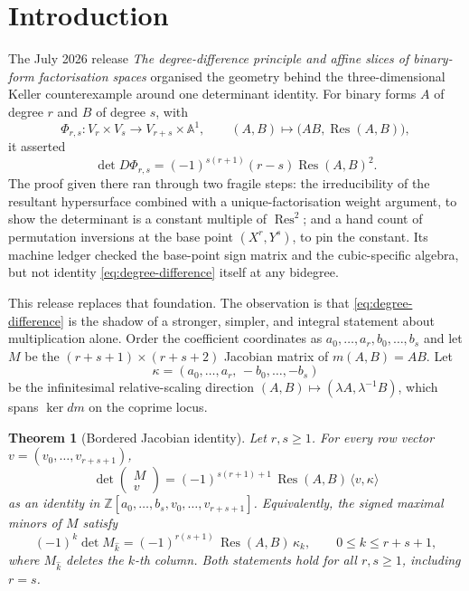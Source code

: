\documentclass[11pt,reqno]{amsart}
\newtheorem{theorem}{Theorem}[section]
\theoremstyle{definition}
\theoremstyle{remark}
\newcommand{\A}{\mathbb A}
\newcommand{\Z}{\mathbb Z}
\newcommand{\Res}{\operatorname{Res}}
\begin{document}
\section{Introduction}

The July 2026 release
\emph{The degree-difference principle and affine slices of binary-form
factorisation spaces} \cite{DDAS} organised the geometry behind the
three-dimensional Keller counterexample
\cite{AlpogeAnnouncement,AnonymousCounterexample} around one
determinant identity.  For binary forms $A$ of degree $r$ and $B$ of
degree $s$, with
\[
 \Phi_{r,s}:V_r\times V_s\longrightarrow V_{r+s}\times\A^1,
 \qquad (A,B)\longmapsto\bigl(AB,\Res(A,B)\bigr),
\]
it asserted
\begin{equation}\label{eq:degree-difference}
 \det D\Phi_{r,s}=(-1)^{s(r+1)}(r-s)\Res(A,B)^2 .
\end{equation}
The proof given there ran through two fragile steps: the
irreducibility of the resultant hypersurface combined with a
unique-factorisation weight argument, to show the determinant is a
constant multiple of $\Res^2$; and a hand count of permutation
inversions at the base point $(X^r,Y^s)$, to pin the constant.  Its
machine ledger checked the base-point sign matrix and the
cubic-specific algebra, but not identity
\eqref{eq:degree-difference} itself at any bidegree.

This release replaces that foundation.  The observation is that
\eqref{eq:degree-difference} is the shadow of a stronger, simpler, and
integral statement about multiplication alone.  Order the coefficient
coordinates as $a_0,\dots,a_r,b_0,\dots,b_s$ and let
$M$ be the $(r+s+1)\times(r+s+2)$ Jacobian matrix of
$m(A,B)=AB$.  Let
\[
 \kappa=(a_0,\dots,a_r,\,-b_0,\dots,-b_s)
\]
be the infinitesimal relative-scaling direction
$(A,B)\mapsto(\lambda A,\lambda^{-1}B)$, which spans $\ker dm$ on the
coprime locus.

\begin{theorem}[Bordered Jacobian identity]\label{thm:bordered}
Let $r,s\ge1$.  For every row vector
$v=(v_0,\dots,v_{r+s+1})$,
\[
 \boxed{\ \det\begin{pmatrix}M\\ v\end{pmatrix}
 =(-1)^{s(r+1)+1}\,\Res(A,B)\,\langle v,\kappa\rangle\ }
\]
as an identity in $\Z[a_0,\dots,b_s,v_0,\dots,v_{r+s+1}]$.
Equivalently, the signed maximal minors of $M$ satisfy
\[
 (-1)^k\det M_{\hat k}
 =(-1)^{r(s+1)}\,\Res(A,B)\,\kappa_k,
 \qquad 0\le k\le r+s+1,
\]
where $M_{\hat k}$ deletes the $k$-th column.  Both statements hold
for all $r,s\ge1$, including $r=s$.
\end{theorem}
\end{document}
